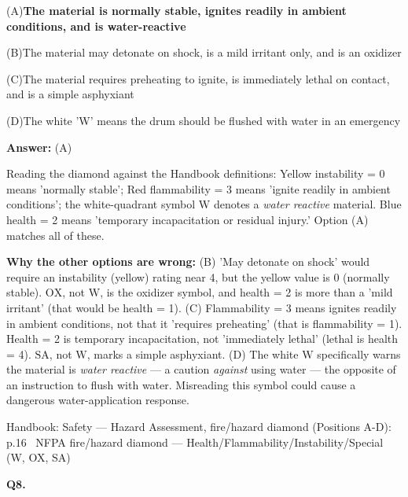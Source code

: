 \documentclass[11pt]{article}
\newcommand{\correct}[1]{\textbf{#1}\;{\color{accent}$\checkmark$}}
\newcommand{\optline}[2]{\par\noindent\hspace{1.2em}(#1)\hspace{0.6em}#2}
\begin{document}
\optline{A}{\correct{The material is normally stable, ignites readily in ambient conditions, and is water-reactive}}
\optline{B}{The material may detonate on shock, is a mild irritant only, and is an oxidizer}
\optline{C}{The material requires preheating to ignite, is immediately lethal on contact, and is a simple asphyxiant}
\optline{D}{The white 'W' means the drum should be flushed with water in an emergency}
\par\vspace{3pt}
\vspace{2pt}\par\noindent\colorbox{boxbg}{\parbox{\dimexpr\linewidth-2\fboxsep\relax}{%
\vspace{2pt}\textbf{Answer:} (A)\par\vspace{2pt}
{\small Reading the diamond against the Handbook definitions: Yellow instability = 0 means 'normally stable'; Red flammability = 3 means 'ignite readily in ambient conditions'; the white-quadrant symbol $\text{W}$ denotes a \emph{water reactive} material. Blue health = 2 means 'temporary incapacitation or residual injury.' Option (A) matches all of these.\par
\textbf{Why the other options are wrong:} (B) 'May detonate on shock' would require an instability (yellow) rating near 4, but the yellow value is 0 (normally stable). $\text{OX}$, not $\text{W}$, is the oxidizer symbol, and health = 2 is more than a 'mild irritant' (that would be health = 1). (C) Flammability = 3 means ignites readily in ambient conditions, not that it 'requires preheating' (that is flammability = 1). Health = 2 is temporary incapacitation, not 'immediately lethal' (lethal is health = 4). $\text{SA}$, not $\text{W}$, marks a simple asphyxiant. (D) The white $\text{W}$ specifically warns the material is \emph{water reactive} --- a caution \emph{against} using water --- the opposite of an instruction to flush with water. Misreading this symbol could cause a dangerous water-application response.\par}\par\vspace{2pt}
{\footnotesize\color{soft}Handbook: Safety --- Hazard Assessment, fire/hazard diamond (Positions A-D): p.16 \textbullet\ NFPA fire/hazard diamond --- Health/Flammability/Instability/Special (W, OX, SA)}\vspace{2pt}
}}
\vspace{9pt}
\filbreak
\textbf{\color{accent}Q8.}\par\vspace{2pt}
\end{document}
